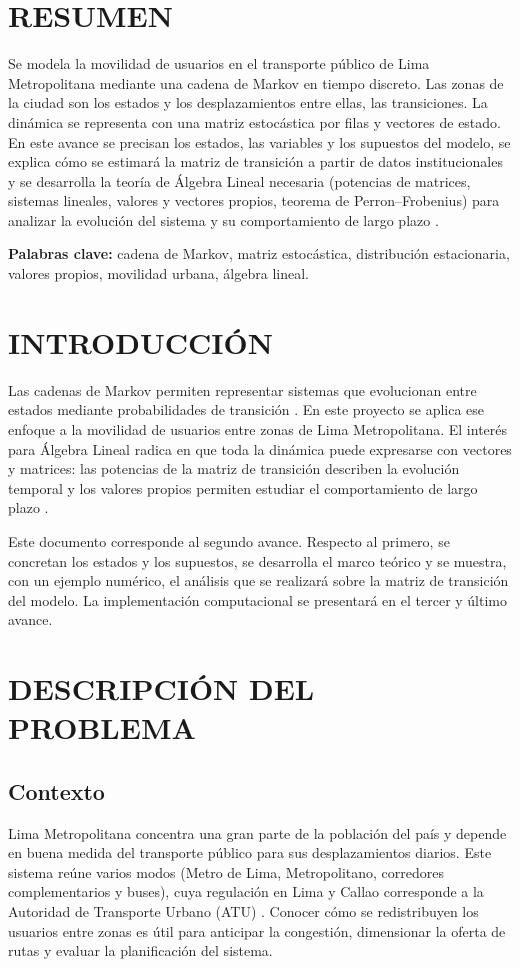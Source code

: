 \documentclass[12pt]{article}
\begin{document}
\newpage
\tableofcontents
\newpage

\section*{RESUMEN}
Se modela la movilidad de usuarios en el transporte público de Lima Metropolitana mediante una
cadena de Markov en tiempo discreto. Las zonas de la ciudad son los estados y los desplazamientos
entre ellas, las transiciones. La dinámica se representa con una matriz estocástica por filas
y vectores de estado. En este avance se precisan los estados, las variables y los supuestos del
modelo, se explica cómo se estimará la matriz de transición a partir de datos institucionales y
se desarrolla la teoría de Álgebra Lineal necesaria (potencias de matrices, sistemas lineales,
valores y vectores propios, teorema de Perron--Frobenius) para analizar la evolución del sistema y
su comportamiento de largo plazo \cite{norris,meyer}.

\textbf{Palabras clave:} cadena de Markov, matriz estocástica, distribución estacionaria,
valores propios, movilidad urbana, álgebra lineal.

\section{INTRODUCCIÓN}
Las cadenas de Markov permiten representar sistemas que evolucionan entre estados mediante
probabilidades de transición \cite{norris,kemeny}. En este proyecto se aplica ese enfoque a la
movilidad de usuarios entre zonas de Lima Metropolitana. El interés para Álgebra Lineal radica
en que toda la dinámica puede expresarse con vectores y matrices: las potencias de la matriz de
transición describen la evolución temporal y los valores propios permiten estudiar el
comportamiento de largo plazo \cite{meyer,strang}.

Este documento corresponde al segundo avance. Respecto al primero, se concretan los estados y
los supuestos, se desarrolla el marco teórico y se muestra, con un ejemplo numérico, el análisis
que se realizará sobre la matriz de transición del modelo. La implementación computacional se
presentará en el tercer y último avance.

\section{DESCRIPCIÓN DEL PROBLEMA}
\subsection{Contexto}
Lima Metropolitana concentra una gran parte de la población del país y depende en buena medida
del transporte público para sus desplazamientos diarios. Este sistema reúne varios modos
(Metro de Lima, Metropolitano, corredores complementarios y buses), cuya regulación en Lima y
Callao corresponde a la Autoridad de Transporte Urbano (ATU) \cite{atu}. Conocer cómo se
redistribuyen los usuarios entre zonas es útil para anticipar la congestión, dimensionar la
oferta de rutas y evaluar la planificación del sistema.
\end{document}
